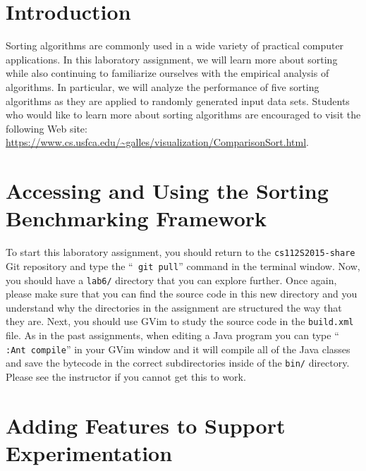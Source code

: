 


\usepackage[compact]{titlesec}


\section*{Introduction}

Sorting algorithms are commonly used in a wide variety of practical computer applications.  In this laboratory
assignment, we will learn more about sorting while also continuing to familiarize ourselves with the empirical analysis
of algorithms.  In particular, we will analyze the performance of five sorting algorithms as they are applied to
randomly generated input data sets.  Students who would like to learn more about sorting algorithms are encouraged to
visit the following Web site: \url{https://www.cs.usfca.edu/~galles/visualization/ComparisonSort.html}.

\section*{Accessing and Using the Sorting Benchmarking Framework}

To start this laboratory assignment, you should return to the {\tt cs112S2015-share} Git repository and type the ``{\tt
git pull}'' command in the terminal window.  Now, you should have a {\tt lab6/} directory that you can explore further.
Once again, please make sure that you can find the source code in this new directory and you understand why the
directories in the assignment are structured the way that they are. Next, you should use GVim to study the source code
in the {\tt build.xml} file.  As in the past assignments, when editing a Java program you can type ``{\tt
:Ant compile}'' in your GVim window and it will compile all of the Java classes and save the bytecode in the correct
subdirectories inside of the {\tt bin/} directory.  Please see the instructor if you cannot get this to work.

\section*{Adding Features to Support Experimentation}

